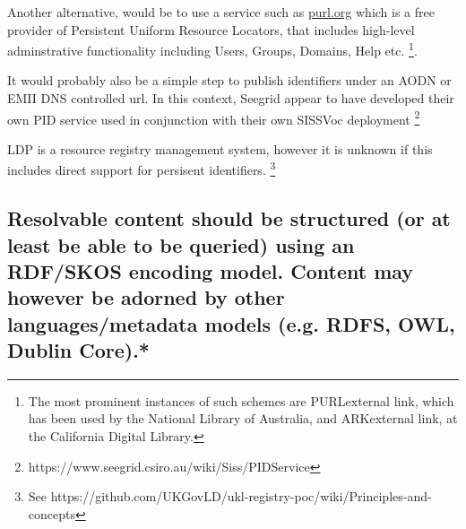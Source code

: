 \documentclass[10pt,a4paper]{article}
\begin{document}
\begin{flushleft}
  \item[]Another alternative, would be to use a service such as \url{purl.org} which is a free provider 
  of Persistent Uniform Resource Locators, that includes high-level adminstrative functionality including 
  Users, Groups, Domains, Help etc.  \footnote{ 
  The most prominent instances of such schemes are PURLexternal link, which has been used
  by the National Library of Australia, and ARKexternal link, at the California
  Digital Library.  }. 

  \item[]It would probably also be a simple step to publish identifiers under an
  AODN or EMII DNS controlled url. In this context, Seegrid appear to have developed their own
  PID service used in conjunction with their own SISSVoc deployment  \footnote{
  https://www.seegrid.csiro.au/wiki/Siss/PIDService}  
  
  \item[]LDP is a resource registry management system, however it is unknown 
  if this includes direct support for persisent identifiers.
    \footnote{ See 
    https://github.com/UKGovLD/ukl-registry-poc/wiki/Principles-and-concepts
  }


% 


% 
%   
% 
% 
% 


\subsection{Resolvable content should be structured (or at least be able to be queried)
  using an RDF/SKOS encoding model. Content may however be adorned by other
  languages/metadata models (e.g. RDFS, OWL, Dublin Core).* }


\end{flushleft}
\end{document}
